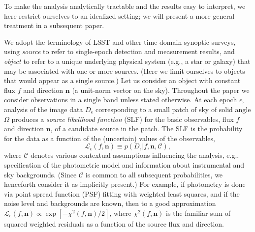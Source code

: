 \documentclass[twocolumn]{emulateapj}
\newcommand{\ctxt}{\mathcal{C}}  %
\newcommand{\eind}{\epsilon}  %
\newcommand{\edata}{D_\eind}  %
\newcommand{\like}{\mathcal{L}}  %
\newcommand{\flux}{f}
\newcommand{\drxn}{\mathbf{n}}
\begin{document}
\noindent 
To make the analysis analytically tractable and the results easy to interpret, we here restrict ourselves to an idealized setting; we will present a more general treatment in a subsequent paper.

We adopt the terminology of LSST and other time-domain synoptic surveys, using \emph{source} to refer to single-epoch detection and measurement results, and \emph{object} to refer to a unique underlying physical system (e.g., a star or galaxy) that may be associated with one or more sources.
(Here we limit ourselves to objects that would appear as a single source.)
Let us consider an object with constant flux $f$ and direction $\drxn$ (a unit-norm vector on the sky). 
Throughout the paper we consider observations in a single band unless stated otherwise.
At each epoch $\eind$, analysis of the image data $\edata$ corresponding to a small patch of sky of solid angle $\Omega$ produces a \emph{source likelihood function} (SLF) for the basic observables, flux $\flux$ and direction $\drxn$, of a candidate source in the patch.
The SLF is the probability for the data as a function of the (uncertain) values of the observables,
\begin{equation}
\like_\eind(\flux,\drxn) \equiv p(\edata|\flux,\drxn,\ctxt),
\label{like-def}
\end{equation}
where $\ctxt$ denotes various contextual assumptions influencing the analysis,
e.g., specification of the photometric model and information about instrumental and sky backgrounds.
(Since $\ctxt$ is common to all subsequent probabilities, we henceforth consider it as implicitly present.)
For example, if photometry is done via point spread function (PSF) fitting with weighted least squares, and if the noise level and backgrounds are known, then to a good approximation $\like_\eind(\flux,\drxn) \propto \exp[-\chi^2(\flux, \drxn)/2]$, where $\chi^2(\flux, \drxn)$ is the familiar sum of squared weighted residuals as a function of the source flux and direction.
\end{document}
